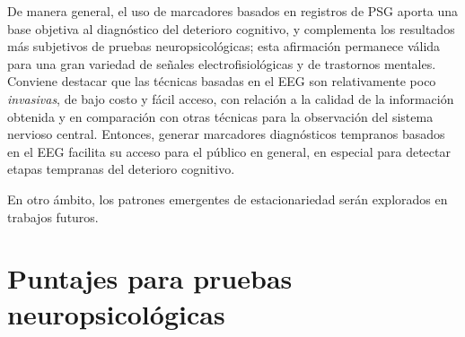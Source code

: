 \documentclass[12pt,letterpaper]{book}
\begin{document}
De manera general, el uso de marcadores basados en registros de PSG aporta una base objetiva al diagnóstico del deterioro cognitivo, y complementa los resultados más subjetivos de pruebas neuropsicológicas; esta afirmación permanece válida para una gran variedad de señales electrofisiológicas y de trastornos mentales.
%
Conviene destacar que las técnicas basadas en el EEG son relativamente poco \textit{invasivas}, de bajo costo y fácil acceso, con relación a la calidad de la información obtenida y en comparación con otras técnicas para la observación del sistema nervioso central.
%
Entonces, generar marcadores diagnósticos tempranos basados en el EEG facilita su acceso para el público en general, en especial para detectar etapas tempranas del deterioro cognitivo.

En otro ámbito, los patrones emergentes de estacionariedad serán explorados en trabajos futuros.


\appendix


\chapter{Puntajes para pruebas neuropsicológicas}
\label{apendice_pruebas}

\end{document}
